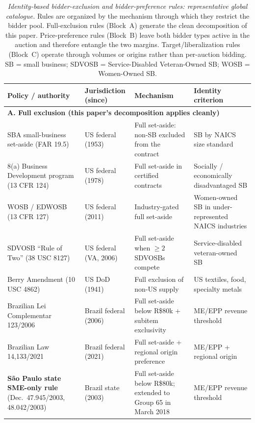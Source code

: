 \begin{table}[p]
\centering
\scriptsize
\caption[Identity-based bidder-exclusion and bidder-preference rules: representative global catalogue.]{\textit{Identity-based bidder-exclusion and bidder-preference rules: representative global catalogue.} Rules are organized by the mechanism through which they restrict the bidder pool. Full-exclusion rules (Block~A) generate the clean decomposition of this paper. Price-preference rules (Block~B) leave both bidder types active in the auction and therefore entangle the two margins. Target/liberalization rules (Block~C) operate through volumes or origins rather than per-auction bidding. SB = small business; SDVOSB = Service-Disabled Veteran-Owned SB; WOSB = Women-Owned SB.}
\label{tab:v3_external_policies}
\begin{threeparttable}
\begin{tabular}{p{4.6cm}p{2.6cm}p{3.2cm}p{3.6cm}}
\toprule
\textbf{Policy / authority} & \textbf{Jurisdiction (since)} & \textbf{Mechanism} & \textbf{Identity criterion} \\
\midrule
\multicolumn{4}{l}{\textbf{A. Full exclusion (this paper's decomposition applies cleanly)}} \\
SBA small-business set-aside (FAR 19.5) & US federal (1953) & Full set-aside: non-SB excluded from the contract & SB by NAICS size standard \\
8(a) Business Development program (13 CFR 124) & US federal (1978) & Full set-aside in certified contracts & Socially / economically disadvantaged SB \\
WOSB / EDWOSB (13 CFR 127) & US federal (2011) & Industry-gated full set-aside & Women-owned SB in under-represented NAICS industries \\
SDVOSB ``Rule of Two'' (38 USC 8127) & US federal (VA, 2006) & Full set-aside when $\geq 2$ SDVOSBs compete & Service-disabled veteran-owned SB \\
Berry Amendment (10 USC 4862) & US DoD (1941) & Full exclusion of non-US supply & US textiles, food, specialty metals \\
Brazilian Lei Complementar 123/2006 & Brazil federal (2006) & Full set-aside below R\$80k + subitem exclusivity & ME/EPP revenue threshold \\
Brazilian Law 14{,}133/2021 & Brazil federal (2021) & Full set-aside + regional origin preference & ME/EPP + regional origin \\
\textbf{S\~ao Paulo state SME-only rule} (Dec.\ 47.945/2003, 48.042/2003) & Brazil state (2003) & Full set-aside below R\$80k; extended to Group 65 in March 2018 & ME/EPP revenue threshold \\

\end{tabular}
\end{threeparttable}
\end{table}
